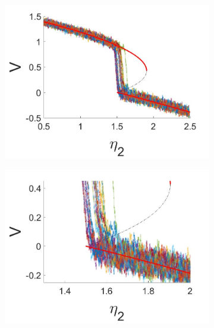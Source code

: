 \begin{figure}[H]
\centering
\begin{subfigure}{.5\textwidth}
 \centering
 \includegraphics[width=\linewidth]{conclusion/stochastic_V.jpg}
 \caption{}
\end{subfigure}%
\begin{subfigure}{.5\textwidth}
 \centering
 \includegraphics[width=\linewidth]{conclusion/stochastic_V_zoom.jpg}
 \caption{}
\end{subfigure}
\begin{subfigure}{.5\textwidth}
 \centering

\end{subfigure}
\end{figure}
